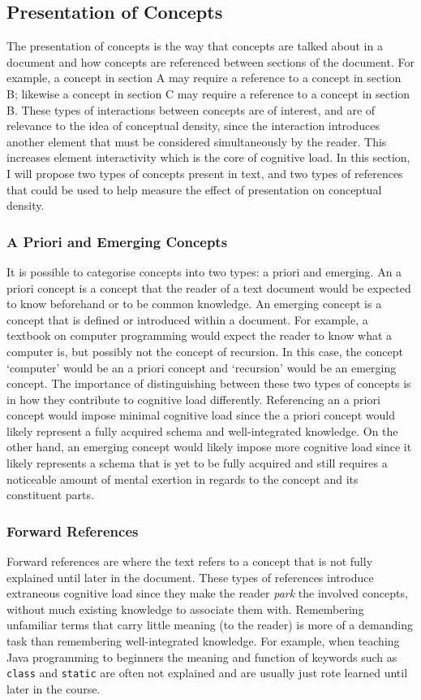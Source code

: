 \documentclass[12pt]{article}
\theoremstyle{grammarstyle}
\begin{document}
\subsection{Presentation of Concepts} \label{sec:presentation of concepts}
The presentation of concepts is the way that concepts are talked about in a document and how concepts are referenced between sections of the document. For example, a concept in section A may require a reference to a concept in section B; likewise a concept in section C may require a reference to a concept in section B. These types of interactions between concepts are of interest, and are of relevance to the idea of conceptual density, since the interaction introduces another element that must be considered simultaneously by the reader.
This increases element interactivity which is the core of cognitive load.
In this section, I will propose two types of concepts present in text, and two types of references that could be used to help measure the effect of presentation on conceptual density.

\subsubsection{A Priori and Emerging Concepts}
It is possible to categorise concepts into two types: a priori and emerging.
An a priori concept is a concept that the reader of a text document would be expected to know beforehand or to be common knowledge.
An emerging concept is a concept that is defined or introduced within a document.
For example, a textbook on computer programming would expect the reader to know what a computer is, but possibly not the concept of recursion. In this case, the concept `computer' would be an a priori concept and `recursion' would be an emerging concept.
The importance of distinguishing between these two types of concepts is in how they contribute to cognitive load differently. Referencing an a priori concept would impose minimal cognitive load since the a priori concept would likely represent a fully acquired schema and well-integrated knowledge. On the other hand, an emerging concept would likely impose more cognitive load since it likely represents a schema that is yet to be fully acquired and still requires a noticeable amount of mental exertion in regards to the concept and its constituent parts.

\subsubsection{Forward References}
Forward references are where the text refers to a concept that is not fully explained until later in the document. These types of references introduce extraneous cognitive load since they make the reader \textit{park} the involved concepts, without much existing knowledge to associate them with. Remembering unfamiliar terms that carry little meaning (to the reader) is more of a demanding task than remembering well-integrated knowledge. For example, when teaching Java programming to beginners the meaning and function of keywords such as \texttt{class} and \texttt{static} are often not explained and are usually just rote learned until later in the course.
\end{document}
